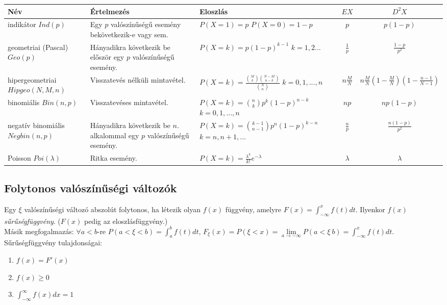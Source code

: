 \documentclass[margin=0px]{article}
\begin{document}
	\begin{tabular}{|p{2.5cm}|p{4cm}|p{4cm}|c|c|}
		\hline \textbf{Név} & \textbf{Értelmezés} & \textbf{Eloszlás} & \textbf{$EX$} & \textbf{$D^{2}X$} \\ 
		\hline indikátor \newline $Ind(p)$ & Egy $p$ valószínűségű esemény bekövetkezik-e vagy sem. & $P(X=1) = p$ \newline $P(X=0) = 1-p$ & $p$ & $p(1-p)$ \\ 
		\hline geometriai (Pascal) \newline $Geo(p)$ & Hányadikra következik be először egy $p$ valószínűségű esemény. & $P(X=k) = p(1-p)^{k-1}$ \newline $k=1,2...$ & $\frac{1}{p}$ & $\frac{1-p}{p^2}$\\ 
		\hline hipergeometriai \newline $Hipgeo(N,M,n)$ & Visszatevés nélküli mintavétel. & $P(X=k) = \frac{{M \choose k}{N-M \choose n-k}}{{N \choose n}}$ \newline $k=0,1,...,n$ & $n \frac{M}{N}$ & $n \frac{M}{N}(1 - \frac{M}{N})(1 - \frac{n-1}{N-1})$ \\ 
		\hline binomiális \newline $Bin(n,p)$ & Visszatevéses mintavétel. & $P(X=k) = {n \choose k}p^{k}(1-p)^{n-k}$ \newline $k=0,1,...,n$ & $np$ & $np(1-p)$ \\ 
		\hline negatív binomiális \newline $Negbin(n,p)$ & Hányadikra következik be $n.$ alkalommal egy $p$ valószínűségű esemény. & $P(X=k) = {k-1 \choose n-1}p^{n}(1-p)^{k-n}$ \newline $k=n,n+1,...$ & $\frac{n}{p}$ & $\frac{n(1-p)}{p^{2}}$ \\ 
		\hline Poisson \newline $Poi(\lambda)$ & Ritka esemény. & $P(X=k) = \frac{\lambda^k}{k!}e^{-\lambda}$ & $\lambda$ & $\lambda$ \\ 
		\hline 
	\end{tabular} 
	
	\subsection{Folytonos valószínűségi változók}
	
	Egy $\xi$ valószínűségi változó abszolút folytonos, ha létezik olyan $f(x)$ függvény, amelyre $F(x) = \int_{-\infty}^{x}{f(t) dt}$. Ilyenkor $f(x)$ \textit{sűrűségfüggvény}. ($F(x)$ pedig az eloszlásfüggvény.) \\
	Másik megfogalmazás: $\forall a < b$-re $P(a < \xi < b) = \int_{a}^{b}{f(t)dt}$, $F_{\xi}(x) = P(\xi < x) = \lim\limits_{a \to -\infty}{P(a < \xi \ b)} = \int_{-\infty}^{x}{f(t)dt}$. \\
	Sűrűségfüggvény tulajdonságai:
	\begin{enumerate}
		\item $f(x) = F'(x)$
		\item $f(x) \geq 0$
		\item $\int_{-\infty}^{\infty}{f(x)dx} = 1$
	\end{enumerate}
	
\end{document}
